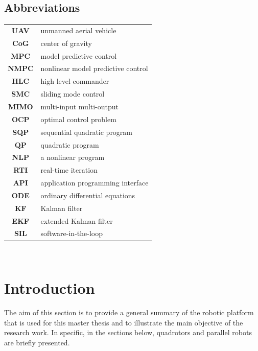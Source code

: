 \documentclass{thesisreport}
\begin{document}
  \section*{Abbreviations}
 \begin{tabular}{cp{}}
  \textbf{UAV} & unmanned aerial vehicle \\
  \textbf{CoG} & center of gravity \\
  \textbf{MPC} & model predictive control \\
  \textbf{NMPC} & nonlinear model predictive control \\
  \textbf{HLC} & high level commander \\
  \textbf{SMC} & sliding mode control \\
  \textbf{MIMO} & multi-input multi-output \\
  \textbf{OCP} & optimal control problem \\
  \textbf{SQP} & sequential quadratic program \\
  \textbf{QP} & quadratic program \\
  \textbf{NLP} & a nonlinear program \\
  \textbf{RTI} & real-time iteration \\
  \textbf{API} & application programming interface \\
  \textbf{ODE} & ordinary differential equations \\
  \textbf{KF} & Kalman filter \\
  \textbf{EKF} & extended Kalman filter \\
  \textbf{SIL} & software-in-the-loop \\
  
  
 \end{tabular}\\
 \newpage
 
 \listoffigures
 
\listoftables
 
 \tableofcontents
 
 
 \chapter*{Introduction}
 The aim of this section is to provide a general summary of the robotic platform that is used for this master thesis and to illustrate the main objective of the research work.
In specific, in the sections below, quadrotors and parallel robots are briefly presented.
\end{document}
